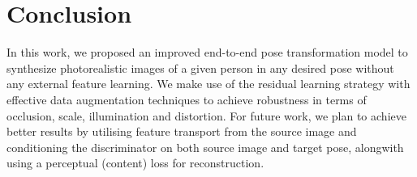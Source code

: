 \documentclass[runningheads]{llncs}
\begin{document}
\section{Conclusion}
In this work, we proposed an improved end-to-end pose transformation model to synthesize photorealistic images of a given person in any desired pose without any external feature learning. We make use of the residual learning strategy with effective data augmentation techniques to achieve robustness in terms of occlusion, scale, illumination and distortion. For future work, we plan to achieve better results by utilising feature transport from the source image and conditioning the discriminator on both source image and target pose, alongwith using a perceptual (content) loss for reconstruction.
%
%
%
%


%
%	
%
%	
%	
%	
%	
\end{document}
